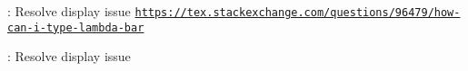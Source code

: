 
\begin{DoxyRefList}
\item[\label{todo__todo000001}%
\Hypertarget{todo__todo000001}%
Module \hyperlink{group___n_i_s_t_const}{N\+I\+S\+T\+Const} ]\+: Resolve  display issue \href{https://tex.stackexchange.com/questions/96479/how-can-i-type-lambda-bar}{\tt https\+://tex.\+stackexchange.\+com/questions/96479/how-\/can-\/i-\/type-\/lambda-\/bar} 

\+: Resolve  display issue 
\end{DoxyRefList}